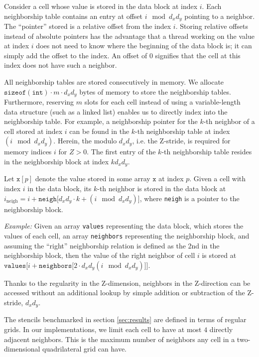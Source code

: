 Consider a cell whose value is stored in the data block at index $i$. Each neighborship table contains an entry at offset $i \mod d_xd_y$ pointing to a neighbor. The ``pointer'' stored is a relative offset from the index $i$. Storing relative offsets instead of absolute pointers has the advantage that a thread working on the value at index $i$ does not need to know where the beginning of the data block is; it can simply add the offset to the index. An offset of $0$ signifies that the cell at this index does not have such a neighbor.

All neighborship tables are stored consecutively in memory. We allocate $\mathtt{sizeof(int)}\cdot m \cdot d_x d_y$ bytes of memory to store the neighborship tables. Furthermore, reserving $m$ slots for each cell instead of using a variable-length data structure (such as a linked list) enables us to directly index into the neighborship table. For example, a neighborship pointer for the $k$-th neighbor of a cell stored at index $i$ can be found in the $k$-th neighborship table at index $(i \mod d_xd_y)$. Herein, the modulo $d_xd_y$, i.e. the Z-stride, is required for memory indices $i$ for $Z>0$. The first entry of the $k$-th neighborship table resides in the neighborship block at index $k d_xd_y$.

Let $\mathtt{x}[p]$ denote the value stored in some array $\mathtt{x}$ at index $p$. Given a cell with index $i$ in the data block, its $k$-th neighbor is stored in the data block at $i_\text{neigh} = i + \mathtt{neigh[}d_xd_y\cdot k + (i \mod d_xd_y)\mathtt{]}$, where \texttt{neigh} is a pointer to the neighborship block.

\textit{Example:} Given an array \texttt{values} representing the data block, which stores the values of each cell, an array \texttt{neighbors} representing the neighborship block, and assuming the ``right'' neighborship relation is defined as the 2nd in the neighborship block, then the value of the right neighbor of cell $i$ is stored at $\mathtt{values[}i + \mathtt{neighbors[}2\cdot d_xd_y(i \mod d_xd_y)\mathtt{]]}$.


Thanks to the regularity in the Z-dimension, neighbors in the Z-direction can be accessed without an additional lookup by simple addition or subtraction of the Z-stride, $d_xd_y$.

The stencils benchmarked in section \ref{sec:results} are defined in terms of regular grids. In our implementations, we limit each cell to have at most $4$ directly adjacent neighbors. This is the maximum number of neighbors any cell in a two-dimensional quadrilateral grid can have.

